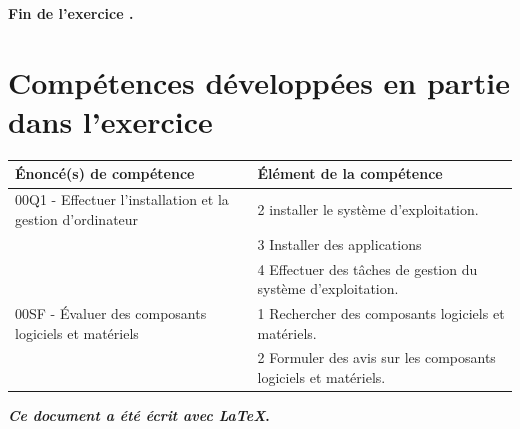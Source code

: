 	
	\vspace{2cm}
	\textbf{ Fin de l'exercice \exercice.}
	
	
	
	
	
	
	
	\section{Compétences développées en partie dans l'exercice \exercice}
	\begin{tabular}{|p{5cm}|l|}
		\hline
		\textbf{Énoncé(s) de compétence}&\textbf{Élément de la compétence} \\[3pt]
		\hline
		00Q1 - Effectuer l’installation et la gestion d’ordinateur&2 installer le système d’exploitation.\\
		&3 Installer des applications\\
		&4 Effectuer des tâches de gestion du système d’exploitation.\\
		\hline
		00SF - Évaluer des composants logiciels et
		matériels&1 Rechercher des composants logiciels et matériels.\\
		&2 Formuler des avis sur les composants logiciels et matériels.\\
		\hline
		
	\end{tabular}
	
	
	
	
	\pagebreak
	
	\renewcommand{\contentsname}{Sommaire} %
	
	\setcounter{tocdepth}{5}
	
	
	\tableofcontents
	
	\pagebreak
	
	
	
	\nocite{*}
	
	
	
	
	\printbibliography
	
	
	
	\textbf{\textit{Ce document a été écrit avec LaTeX}.}\\
	
	
	


